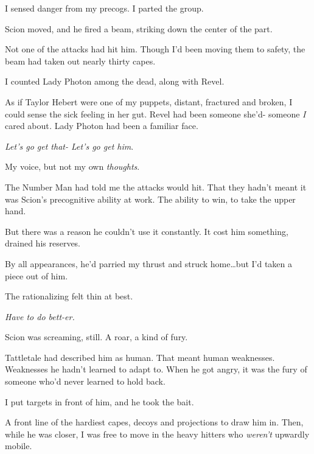 I sensed danger from my precogs.  I parted the group.



Scion moved, and he fired a beam, striking down the center of the part.



Not one of the attacks had hit him.  Though I'd been moving them to safety, the beam had taken out nearly thirty capes.



I counted Lady Photon among the dead, along with Revel.



As if Taylor Hebert were one of my puppets, distant, fractured and broken, I could sense the sick feeling in her gut.  Revel had been someone she'd- someone \emph{I }cared about\emph{.  }Lady Photon had been a familiar face.



\emph{Let's go get that-  Let's go get him}.



My voice, but not my own \emph{thoughts}.



The Number Man had told me the attacks would hit.  That they hadn't meant it was Scion's precognitive ability at work.  The ability to win, to take the upper hand.



But there was a reason he couldn't use it constantly.  It cost him something, drained his reserves.



By all appearances, he'd parried my thrust and struck home\ldots but I'd taken a piece out of him.



The rationalizing felt thin at best.



\emph{Have to do bett-er.}



Scion was screaming, still.  A roar, a kind of fury.



Tattletale had described him as human.  That meant human weaknesses.  Weaknesses he hadn't learned to adapt to.  When he got angry, it was the fury of someone who'd never learned to hold back.



I put targets in front of him, and he took the bait.



A front line of the hardiest capes, decoys and projections to draw him in.  Then, while he was closer, I was free to move in the heavy hitters who \emph{weren't} upwardly mobile.



